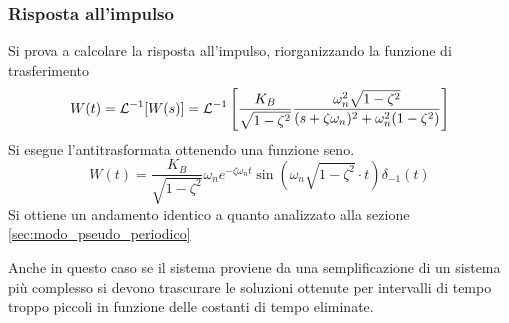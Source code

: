 \subsubsection{Risposta all'impulso}
Si prova a calcolare la risposta all'impulso, riorganizzando la funzione di
trasferimento
$$
W(t) = \mathcal{L}^{-1}[W(s)] =
\mathcal{L}^{-1}\left[\frac{K_B}{\sqrt{1-\zeta^2}}\frac{\omega_n^2
\sqrt{1-\zeta^2}}{(s+\zeta\omega_n)^2+\omega_n^2(1-\zeta^2 ) } \right]
$$
Si esegue l'antitrasformata ottenendo una funzione seno.
$$
W(t) = \frac{K_B}{\sqrt{1-\zeta^2}}\omega_n e^{-\zeta\omega_n t}
\sin\left(\omega_n\sqrt{1-\zeta^2}\cdot t\right)\delta_{-1}(t)
$$
\newpage
Si ottiene un andamento identico a quanto analizzato alla sezione
\ref{sec:modo_pseudo_periodico}
\begin{figure}[h]
\centering
\end{figure}
Anche in questo caso se il sistema proviene da una semplificazione di un
sistema più complesso si devono trascurare le soluzioni ottenute per intervalli
di tempo troppo piccoli in funzione delle costanti di tempo eliminate.

